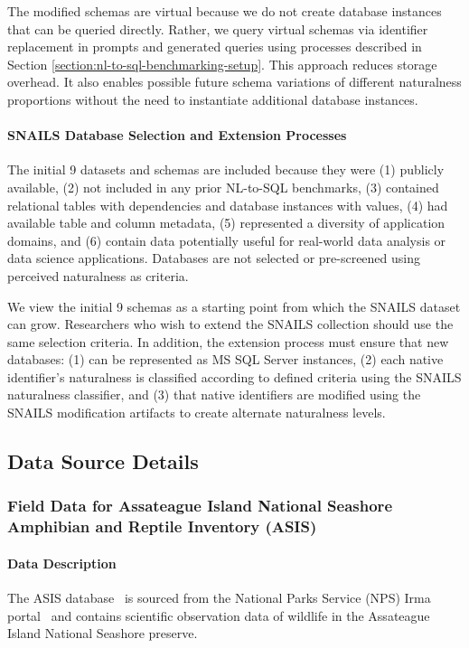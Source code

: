 The modified schemas are virtual because we do not create database instances that can be queried directly.
Rather, we query virtual schemas via identifier replacement in prompts and generated queries using processes described in Section \ref{section:nl-to-sql-benchmarking-setup}.
This approach reduces storage overhead.
It also enables possible future schema variations of different naturalness proportions without the need to instantiate additional database instances.

\paragraph{\textbf{SNAILS Database Selection and Extension Processes}}
The initial 9 datasets and schemas are included because they were (1) publicly available, (2) not included in any prior NL-to-SQL benchmarks, (3) contained relational tables with dependencies and database instances with values, (4) had available table and column metadata, (5) represented a diversity of application domains, and (6) contain data potentially useful for real-world data analysis or data science applications.
Databases are not selected or pre-screened using perceived naturalness as criteria.

We view the initial 9 schemas as a starting point from which the SNAILS dataset can grow.
Researchers who wish to extend the SNAILS collection should use the same selection criteria.
In addition, the extension process must ensure that new databases:  (1) can be represented as MS SQL Server instances, (2) each native identifier's naturalness is classified according to defined criteria using the SNAILS naturalness classifier, and (3) that native identifiers are modified using the SNAILS modification artifacts to create alternate naturalness levels. 

\subsection{Data Source Details}

\subsubsection{Field Data for Assateague Island National Seashore Amphibian and Reptile Inventory (ASIS)}

\paragraph{Data Description} 
The ASIS database~\cite{assateague-herp} is sourced from the National Parks Service (NPS) Irma portal~\cite{nps-irma-portal} and contains scientific observation data of wildlife in the Assateague Island National Seashore preserve.

